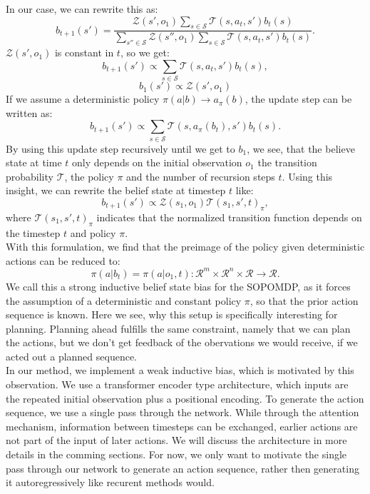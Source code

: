 In our case, we can rewrite this as:
\begin{equation}
    b_{t+1}(s') = \frac{\mathcal{Z}(s', o_{1}) \sum_{s \in \mathcal{S}} \mathcal{T}(s, a_t, s') b_t(s)}{\sum_{s'' \in \mathcal{S}} \mathcal{Z}(s'', o_{1}) \sum_{s \in \mathcal{S}} \mathcal{T}(s, a_t, s') b_t(s)}.
\end{equation}
$\mathcal{Z}(s', o_{1})$ is constant in $t$, so we get:
\begin{equation*}
    b_{t+1}(s') \propto \sum_{s \in \mathcal{S}} \mathcal{T}(s, a_t, s') b_t(s),
\end{equation*}
\begin{equation}
    b_{1}(s') \propto \mathcal{Z}(s', o_{1})
\end{equation}
If we assume a deterministic policy $\pi(a|b) \rightarrow a_{\pi}(b)$, the update step can be written as:
\begin{equation}
    b_{t+1}(s') \propto \sum_{s \in \mathcal{S}} \mathcal{T}(s, a_{\pi}(b_t), s') b_t(s).
\end{equation}
By using this update step recursively until we get to $b_{1}$, we see, that the believe state at time $t$ only depends on the initial observation $o_1$
the transition probability $\mathcal{T}$, the policy $\pi$ and the number of recursion steps $t$. Using this insight, we can rewrite the belief state at timestep $t$ like:
\begin{equation}
    b_{t+1}(s') \propto \mathcal{Z}(s_1, o_{1}) \mathcal{T}(s_1, s', t)_{\pi},
\end{equation}
where $\mathcal{T}(s_1, s', t)_{\pi}$ indicates that the normalized transition function depends on the timestep $t$ and policy $\pi$.\\
With this formulation, we find that the preimage of the policy given deterministic actions can be reduced to:
$$\pi(a|b_t) = \pi(a|o_1, t): \mathcal{R}^m \times \mathcal{R}^{n} \times \mathcal{R} \rightarrow \mathcal{R}.$$
We call this a strong inductive belief state bias for the SOPOMDP, as it forces the assumption of a deterministic and constant policy $\pi$, so that the prior action sequence is known. 
Here we see, 
why this setup is specifically interesting for planning. Planning ahead fulfills the same constraint, namely that we can plan the actions, but we don't get feedback of the 
obervations we would receive, if we acted out a planned sequence. \\

In our method, we implement a weak inductive bias, which is motivated by this observation. We use a transformer encoder type architecture, which inputs are 
the repeated initial observation plus a positional encoding. To generate the action sequence, we use a single pass through the network. While through the attention mechanism, 
information between timesteps can be exchanged, earlier actions are not part of the input of later actions. 
We will discuss the architecture in more details in the comming sections. For now, we only want to motivate the single pass through 
our network to generate an action sequence, rather then generating it autoregressively like recurent methods would.\\ 

